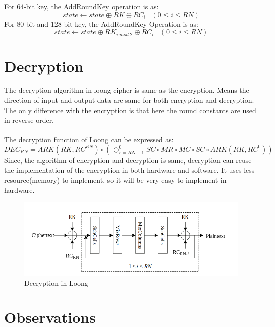 \documentclass[preprint]{transcrypto}
\begin{document}
For 64-bit key, the AddRoundKey operation is as:
\begin{equation}
    state \leftarrow state \oplus RK \oplus RC_{i} \hspace{10pt}
    (0 \leq i \leq RN)     
\end{equation}
For 80-bit and 128-bit key, the AddRoundKey Operation is as:\\
\begin{equation}
    state \leftarrow state \oplus RK_{i\;mod\;2} \oplus RC_{i}
    \hspace{10pt}
    (0 \leq i \leq RN) 
\end{equation}




\section{Decryption}
The decryption algorithm in loong cipher is same as the encryption. Means the direction of input and output data are same for both encryption and decryption. The only difference with the encryption is that here the round constants are used in reverse order.\\\\
The decryption function of Loong can be expressed as:
\begin{equation}
    DEC_{RN} = ARK(RK, RC^{RN}) \circ (\bigcirc_{r = RN-1}^{0} SC \circ MR \circ MC \circ SC \circ ARK(RK, RC^0))
\end{equation}
Since, the algorithm of encryption and decryption is same, decryption can reuse the implementation of the encryption in both hardware and software. It uses less resource(memory) to implement, so it will be very easy to implement in hardware.
\begin{figure}[H]
	\centering
	\includegraphics[width=12cm]{decrypt.png}
	\caption{Decryption in Loong}
\end{figure}



\section{Observations}
\end{document}
